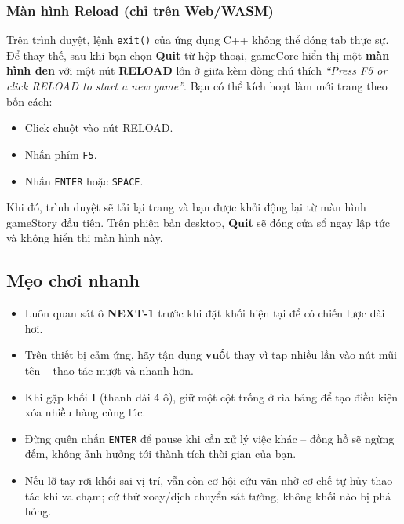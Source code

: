 \documentclass[12pt,a4paper]{article}
\begin{document}
\subsubsection{Màn hình Reload (chỉ trên Web/WASM)}
Trên trình duyệt, lệnh \texttt{exit()} của ứng dụng C++ không thể đóng tab thực sự.
Để thay thế, sau khi bạn chọn \textbf{Quit} từ hộp thoại, gameCore hiển thị một \textbf{màn hình đen} với một nút \textbf{RELOAD} lớn ở giữa kèm dòng chú thích \textit{``Press F5 or click RELOAD to start a new game''}.
Bạn có thể kích hoạt làm mới trang theo bốn cách:
\begin{itemize}
    \item Click chuột vào nút RELOAD.
    \item Nhấn phím \texttt{F5}.
    \item Nhấn \texttt{ENTER} hoặc \texttt{SPACE}.
\end{itemize}
Khi đó, trình duyệt sẽ tải lại trang và bạn được khởi động lại từ màn hình gameStory đầu tiên.
Trên phiên bản desktop, \textbf{Quit} sẽ đóng cửa sổ ngay lập tức và không hiển thị màn hình này.
\subsection{Mẹo chơi nhanh}
\begin{itemize}
    \item Luôn quan sát ô \textbf{NEXT-1} trước khi đặt khối hiện tại để có chiến lược dài hơi.
    \item Trên thiết bị cảm ứng, hãy tận dụng \textbf{vuốt} thay vì tap nhiều lần vào nút mũi tên -- thao tác mượt và nhanh hơn.
    \item Khi gặp khối \textbf{I} (thanh dài 4 ô), giữ một cột trống ở rìa bảng để tạo điều kiện xóa nhiều hàng cùng lúc.
    \item Đừng quên nhấn \texttt{ENTER} để pause khi cần xử lý việc khác -- đồng hồ sẽ ngừng đếm, không ảnh hưởng tới thành tích thời gian của bạn.
    \item Nếu lỡ tay rơi khối sai vị trí, vẫn còn cơ hội cứu vãn nhờ cơ chế tự hủy thao tác khi va chạm;
cứ thử xoay/dịch chuyển sát tường, không khối nào bị phá hỏng.
\end{itemize}


\newpage

\noindent{}
\vspace{8pt}
\end{document}
